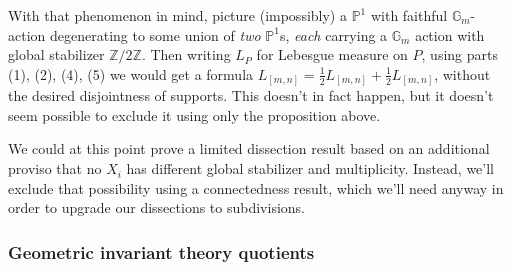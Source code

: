 \documentclass[10pt,a4paper]{amsart}
\newcommand{\ZZ}{\mathbb{Z}}
\newcommand{\PP}{\mathbb{P}}
\newcommand\Gm{{\mathbb G}_m}
\begin{document}
With that phenomenon in mind, picture (impossibly) a $\PP^1$ with faithful
$\Gm$-action degenerating to some union of {\em two} $\PP^1$s, {\em each}
carrying a $\Gm$ action with global stabilizer $\ZZ/2\ZZ$. Then writing $L_P$
for Lebesgue measure on $P$, using parts (1), (2), (4), (5) we would
get a formula $L_{[m,n]} = \frac 1 2 L_{[m,n]} + \frac 1 2 L_{[m,n]}$,
without the desired disjointness of supports. This doesn't in fact
happen, but it doesn't seem possible to exclude it using only the
proposition above.

We could at this point prove a limited dissection result based on an additional
proviso that no $X_i$ has different global stabilizer and multiplicity.
Instead, we'll exclude that possibility using a connectedness result,
which we'll need anyway in order to upgrade our dissections to subdivisions.




\subsubsection{Geometric invariant theory quotients}
\end{document}
